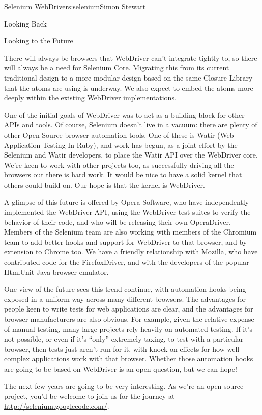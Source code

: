\begin{aosachapter}{Selenium WebDriver}{s:selenium}{Simon Stewart}
\begin{aosasect1}{Looking Back}
\end{aosasect1}

\begin{aosasect1}{Looking to the Future}

There will always be browsers that WebDriver can't integrate tightly
to, so there will always be a need for Selenium Core. Migrating this
from its current traditional design to a more modular design based on
the same Closure Library that the atoms are using is underway. We also
expect to embed the atoms more deeply within the existing WebDriver
implementations.

One of the initial goals of WebDriver was to act as a building block
for other APIs and tools. Of course, Selenium doesn't live in a
vacuum: there are plenty of other Open Source browser automation
tools. One of these is Watir (Web Application Testing In Ruby), and
work has begun, as a joint effort by the Selenium and Watir
developers, to place the Watir API over the WebDriver core. We're keen
to work with other projects too, as successfully driving all the
browsers out there is hard work. It would be nice to have a solid
kernel that others could build on. Our hope is that the kernel is
WebDriver.

A glimpse of this future is offered by Opera Software, who have
independently implemented the WebDriver API, using the WebDriver test
suites to verify the behavior of their code, and who will be
releasing their own OperaDriver. Members of the Selenium team are also
working with members of the Chromium team to add better hooks and
support for WebDriver to that browser, and by extension to Chrome
too. We have a friendly relationship with Mozilla, who have
contributed code for the FirefoxDriver, and with the developers of the
popular HtmlUnit Java browser emulator.

One view of the future sees this trend continue, with automation hooks
being exposed in a uniform way across many different browsers. The
advantages for people keen to write tests for web applications are
clear, and the advantages for browser manufacturers are also
obvious. For example, given the relative expense of manual testing,
many large projects rely heavily on automated testing. If it's not
possible, or even if it's ``only'' extremely taxing, to test with a
particular browser, then tests just aren't run for it, with knock-on
effects for how well complex applications work with that
browser. Whether those automation hooks are going to be based on
WebDriver is an open question, but we can hope!

The next few years are going to be very interesting. As we're an open
source project, you'd be welcome to join us for the journey at
\url{http://selenium.googlecode.com/}.

\end{aosasect1}

\end{aosachapter}
